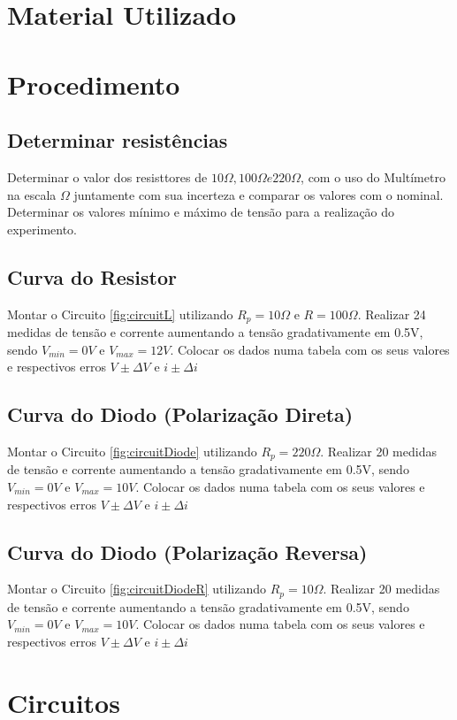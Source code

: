 \documentclass{article}
\begin{document}
    
    \section{Material Utilizado}
        
    \section{Procedimento}
        \subsection{Determinar resistências}
            Determinar o valor dos resisttores de 
            $10\Omega, 100\Omega e 220\Omega$, 
            com o uso do Multímetro na escala $\Omega$ 
            juntamente com sua incerteza e comparar os valores com o nominal.
            \newline
            Determinar os valores mínimo e máximo de tensão para a realização do experimento.
        \subsection{Curva do Resistor}
            Montar o Circuito \ref{fig:circuitL} 
            utilizando $R_p = 10\Omega$ e $R = 100\Omega$.
            \newline
            Realizar 24 medidas de tensão e corrente aumentando 
            a tensão gradativamente em 0.5V, sendo $V_{min}=0V$ e $V_{max}=12V$. 
            \newline
            Colocar os dados numa tabela com os seus valores e respectivos erros $V\pm\Delta V$
            e $i\pm\Delta i$
        \subsection{Curva do Diodo (Polarização Direta)}
            Montar o Circuito \ref{fig:circuitDiode} 
            utilizando $R_p = 220\Omega$.
            \newline
            Realizar 20 medidas de tensão e corrente aumentando 
            a tensão gradativamente em 0.5V, sendo $V_{min}=0V$ e $V_{max}=10V$. 
            \newline
            Colocar os dados numa tabela com os seus valores e respectivos erros $V\pm\Delta V$
            e $i\pm\Delta i$
        \subsection{Curva do Diodo (Polarização Reversa)}
            Montar o Circuito \ref{fig:circuitDiodeR} 
            utilizando $R_p = 10\Omega$.
            \newline
            Realizar 20 medidas de tensão e corrente aumentando 
            a tensão gradativamente em 0.5V, sendo $V_{min}=0V$ e $V_{max}=10V$. 
            \newline
            Colocar os dados numa tabela com os seus valores e respectivos erros 
            $V\pm\Delta V$ e $i\pm\Delta i$
    \section{Circuitos}
        
\end{document}
